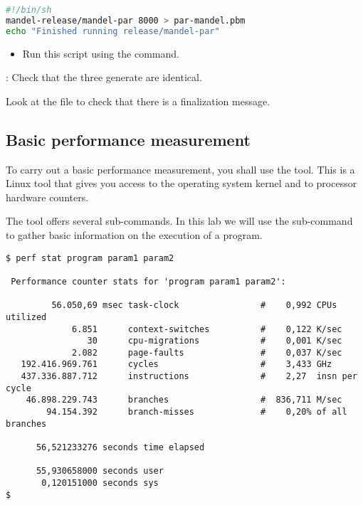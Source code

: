 \begin{enumerate}
\begin{lstlisting}[language=bash,title={File: run-par-mandel.sh},frame=single]
#!/bin/sh
mandel-release/mandel-par 8000 > par-mandel.pbm
echo "Finished running release/mandel-par"
\end{lstlisting}
    \begin{itemize}
      \item Run this script using the  command.
    \end{itemize}
\end{enumerate}


: 
Check that the three generate  are identical.

Look at the  file to check that there is a finalization message.

\subsection{Basic performance measurement}

To carry out a basic performance measurement, you shall use the  tool.
This is a Linux tool that gives you access to the operating system kernel
and to processor hardware counters.

The  tool offers several sub-commands.
In this lab we will use the  sub-command to gather
basic information on the execution of a program.

\begin{lstlisting}[style=terminal,basicstyle=\ttfamily]
$ perf stat program param1 param2

 Performance counter stats for 'program param1 param2':

         56.050,69 msec task-clock                #    0,992 CPUs utilized          
             6.851      context-switches          #    0,122 K/sec                  
                30      cpu-migrations            #    0,001 K/sec                  
             2.082      page-faults               #    0,037 K/sec                  
   192.416.969.761      cycles                    #    3,433 GHz                    
   437.336.887.712      instructions              #    2,27  insn per cycle         
    46.898.229.743      branches                  #  836,711 M/sec                  
        94.154.392      branch-misses             #    0,20% of all branches        

      56,521233276 seconds time elapsed

      55,930658000 seconds user
       0,120151000 seconds sys
$
\end{lstlisting}

